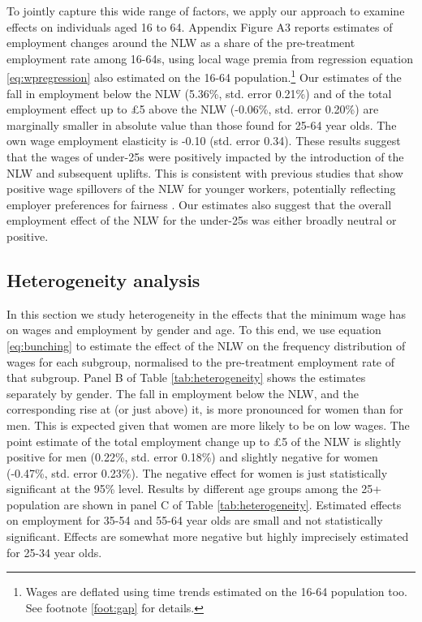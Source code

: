 To jointly capture this wide range of factors, we apply our approach to examine effects on individuals aged 16 to 64. Appendix Figure A3 reports estimates of employment changes around the NLW as a share of the pre-treatment employment rate among 16-64s, using local wage premia from regression equation \ref{eq:wpregression} also estimated on the 16-64 population.\footnote{Wages are deflated using time trends estimated on the 16-64 population too. See footnote \ref{foot:gap} for details.} Our estimates of the fall in employment below the NLW (5.36\%, std. error 0.21\%) and of the total employment effect up to \pounds 5 above the NLW (-0.06\%, std. error 0.20\%) are marginally smaller in absolute value than those found for 25-64 year olds. The own wage employment elasticity is -0.10 (std. error 0.34). These results suggest that the wages of under-25s were positively impacted by the introduction of the NLW and subsequent uplifts. This is consistent with previous studies that show positive wage spillovers of the NLW for younger workers, potentially reflecting employer preferences for fairness \citep{GiupponiMachin2022}. Our estimates also suggest that the overall employment effect of the NLW for the under-25s was either broadly neutral or positive. 


\subsection{Heterogeneity analysis} \label{sec:lm_heterogeneity}

In this section we study heterogeneity in the effects that the minimum wage has on wages and employment by gender and age. To this end, we use equation \ref{eq:bunching} to estimate the effect of the NLW on the frequency distribution of wages for each subgroup, normalised to the pre-treatment employment rate of that subgroup. Panel B of Table \ref{tab:heterogeneity} shows the estimates separately by gender. The fall in employment below the NLW, and the corresponding rise at (or just above) it, is more pronounced for women than for men. This is expected given that women are more likely to be on low wages. The point estimate of the total employment change up to £5 of the NLW is slightly positive for men (0.22\%, std. error 0.18\%) and slightly negative for women (-0.47\%, std. error 0.23\%). The negative effect for women is just statistically significant at the 95\% level. Results by different age groups among the 25+ population are shown in panel C of Table \ref{tab:heterogeneity}. Estimated effects on employment for 35-54 and 55-64 year olds are small and not statistically significant. Effects are somewhat more negative but highly imprecisely estimated for 25-34 year olds.


